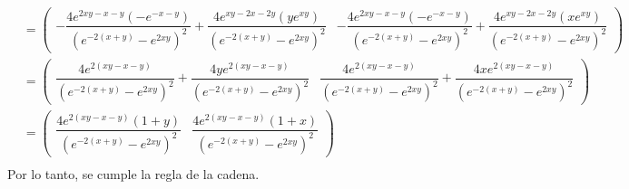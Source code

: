 \documentclass[fleqn]{article}
\begin{document}
\begin{enumerate}
\begin{align*}
            &= \left( \begin{matrix} - \dfrac{4 e^{2xy - x - y} (-e^{-x - y})}{(e^{-2(x + y)} - e^{2xy})^2} + \dfrac{4 e^{xy - 2x - 2y} (y e^{xy})}{(e^{-2(x + y)} - e^{2xy})^2} & - \dfrac{4 e^{2xy - x - y} (-e^{-x - y})}{(e^{-2(x + y)} - e^{2xy})^2} + \dfrac{4 e^{xy - 2x - 2y} (x e^{xy})}{(e^{-2(x + y)} - e^{2xy})^2} \end{matrix} \right) \\
            &= \left( \begin{matrix} \dfrac{4 e^{2(xy - x - y)}}{(e^{-2(x + y)} - e^{2xy})^2} + \dfrac{4y e^{2(xy - x - y)}}{(e^{-2(x + y)} - e^{2xy})^2} & \dfrac{4 e^{2(xy - x - y)}}{(e^{-2(x + y)} - e^{2xy})^2} + \dfrac{4x e^{2(xy - x - y)}}{(e^{-2(x + y)} - e^{2xy})^2} \end{matrix} \right) \\
            &= \left( \begin{matrix} \dfrac{4 e^{2(xy - x - y)} (1 + y)}{(e^{-2(x + y)} - e^{2xy})^2} & \dfrac{4 e^{2(xy - x - y)} (1 + x)}{(e^{-2(x + y)} - e^{2xy})^2} \end{matrix} \right) \\
        \end{align*}
        Por lo tanto, se cumple la regla de la cadena.
    \end{enumerate}
\end{document}
